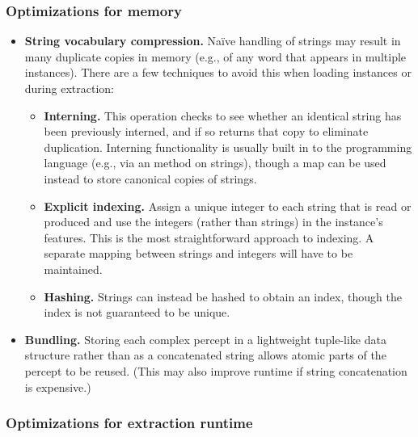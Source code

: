 \documentclass[11pt,letterpaper]{article}
\begin{document}
\subsubsection{Optimizations for memory}

\begin{itemize}
\item \textbf{String vocabulary compression.}
Na\"{i}ve handling of strings may result in many duplicate copies in memory 
(e.g., of any word that appears in multiple instances). 
There are a few techniques to avoid this when loading instances or during extraction:
\begin{itemize}
\item \textbf{Interning.} This operation checks to see whether an identical string has been previously interned, 
and if so returns that copy to eliminate duplication.
Interning functionality is usually built in to the programming language (e.g., via an  method on strings), 
though a map can be used instead to store canonical copies of strings.
\item \textbf{Explicit indexing.} 
Assign a unique integer to each string that is read or produced 
and use the integers (rather than strings) in the instance's features. 
This is the most straightforward approach to indexing.
A separate mapping between strings and integers will have to be maintained. 
\item \textbf{Hashing.} Strings can instead be hashed to obtain an index, 
though the index is not guaranteed to be unique.
\end{itemize}

\item \textbf{Bundling.} 
Storing each complex percept in a lightweight tuple-like data structure rather than as a concatenated string 
allows atomic parts of the percept to be reused. 
(This may also improve runtime if string concatenation is expensive.)
\end{itemize}

\subsubsection{Optimizations for extraction runtime}\label{sec:hashing}
\end{document}
